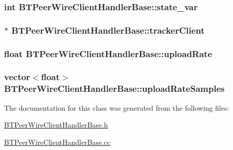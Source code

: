 \subsubsection[{state\+\_\+var}]{\setlength{\rightskip}{0pt plus 5cm}int B\+T\+Peer\+Wire\+Client\+Handler\+Base\+::state\+\_\+var\hspace{0.3cm}{\ttfamily [protected]}}\label{classBTPeerWireClientHandlerBase_a97d1f49189fd7f912b4148b128518f84}
\hypertarget{classBTPeerWireClientHandlerBase_a9c42f83915497b67123ae9232b2ddae5}{}
\subsubsection[{tracker\+Client}]{$\ast$ B\+T\+Peer\+Wire\+Client\+Handler\+Base\+::tracker\+Client\hspace{0.3cm}{\ttfamily [protected]}}\label{classBTPeerWireClientHandlerBase_a9c42f83915497b67123ae9232b2ddae5}
\hypertarget{classBTPeerWireClientHandlerBase_afdfbe8c92b63172725568445ddf09ddf}{}
\subsubsection[{upload\+Rate}]{\setlength{\rightskip}{0pt plus 5cm}float B\+T\+Peer\+Wire\+Client\+Handler\+Base\+::upload\+Rate\hspace{0.3cm}{\ttfamily [protected]}}\label{classBTPeerWireClientHandlerBase_afdfbe8c92b63172725568445ddf09ddf}
\hypertarget{classBTPeerWireClientHandlerBase_a14e7dcfe2478465cc7e4d8f715bd5bc2}{}
\subsubsection[{upload\+Rate\+Samples}]{\setlength{\rightskip}{0pt plus 5cm}vector$<$float$>$ B\+T\+Peer\+Wire\+Client\+Handler\+Base\+::upload\+Rate\+Samples\hspace{0.3cm}{\ttfamily [protected]}}\label{classBTPeerWireClientHandlerBase_a14e7dcfe2478465cc7e4d8f715bd5bc2}


The documentation for this class was generated from the following files\+:\begin{DoxyCompactItemize}
\item 
\hyperlink{BTPeerWireClientHandlerBase_8h}{B\+T\+Peer\+Wire\+Client\+Handler\+Base.\+h}\item 
\hyperlink{BTPeerWireClientHandlerBase_8cc}{B\+T\+Peer\+Wire\+Client\+Handler\+Base.\+cc}\end{DoxyCompactItemize}
